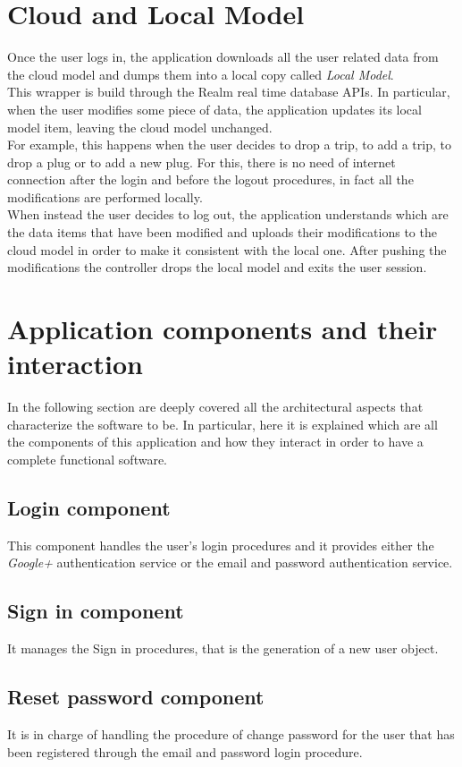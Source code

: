 \section{Cloud and Local Model}
Once the user logs in, the application downloads all the user related data from the cloud model and dumps them into a local copy called \textit{Local Model}. \\
This wrapper is build through the Realm real time database APIs. In particular, when the user modifies some piece of data, the application updates its local model item, leaving the cloud model unchanged.\\
For example, this happens when the user decides to drop a trip, to add a trip, to drop a plug or to add a new plug. 
For this, there is no need of internet connection after the login and before the logout procedures, in fact all the modifications are performed locally.\\
When instead the user decides to log out, the application understands which are the data items that have been modified and uploads their modifications to the cloud model in order to make it consistent with the local one. 
After pushing the modifications the controller drops the local model and exits the user session.

\section{Application components and their interaction}
In the following section are deeply covered all the architectural aspects that characterize the software to be. In particular, here it is explained which are all the components of this application and how they interact in order to have a complete functional software.

\subsection{Login component}
This component handles the user's login procedures and it provides either the \textit{Google+} authentication service or the email and password authentication service.

\subsection{Sign in component}
It manages the Sign in procedures, that is the generation of a new user object.

\subsection{Reset password component}
It is in charge of handling the procedure of change password for the user that has been registered through the email and password login procedure.

